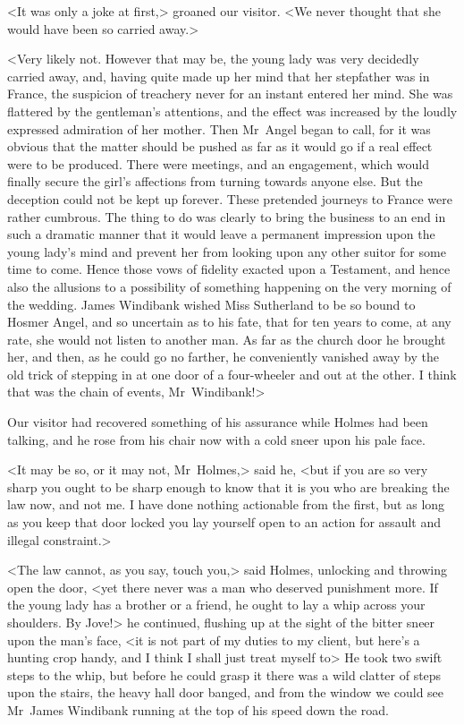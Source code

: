 <It was only a joke at first,> groaned our visitor. <We never thought that she would have been so carried away.>

<Very likely not. However that may be, the young lady was very decidedly carried away, and, having quite made up her mind that her stepfather was in France, the suspicion of treachery never for an instant entered her mind. She was flattered by the gentleman's attentions, and the effect was increased by the loudly expressed admiration of her mother. Then Mr~Angel began to call, for it was obvious that the matter should be pushed as far as it would go if a real effect were to be produced. There were meetings, and an engagement, which would finally secure the girl's affections from turning towards anyone else. But the deception could not be kept up forever. These pretended journeys to France were rather cumbrous. The thing to do was clearly to bring the business to an end in such a dramatic manner that it would leave a permanent impression upon the young lady's mind and prevent her from looking upon any other suitor for some time to come. Hence those vows of fidelity exacted upon a Testament, and hence also the allusions to a possibility of something happening on the very morning of the wedding. James Windibank wished Miss Sutherland to be so bound to Hosmer Angel, and so uncertain as to his fate, that for ten years to come, at any rate, she would not listen to another man. As far as the church door he brought her, and then, as he could go no farther, he conveniently vanished away by the old trick of stepping in at one door of a four-wheeler and out at the other. I think that was the chain of events, Mr~Windibank!>

Our visitor had recovered something of his assurance while Holmes had been talking, and he rose from his chair now with a cold sneer upon his pale face.

<It may be so, or it may not, Mr~Holmes,> said he, <but if you are so very sharp you ought to be sharp enough to know that it is you who are breaking the law now, and not me. I have done nothing actionable from the first, but as long as you keep that door locked you lay yourself open to an action for assault and illegal constraint.>

<The law cannot, as you say, touch you,> said Holmes, unlocking and throwing open the door, <yet there never was a man who deserved punishment more. If the young lady has a brother or a friend, he ought to lay a whip across your shoulders. By Jove!> he continued, flushing up at the sight of the bitter sneer upon the man's face, <it is not part of my duties to my client, but here's a hunting crop handy, and I think I shall just treat myself to\longdash> He took two swift steps to the whip, but before he could grasp it there was a wild clatter of steps upon the stairs, the heavy hall door banged, and from the window we could see Mr~James Windibank running at the top of his speed down the road.

